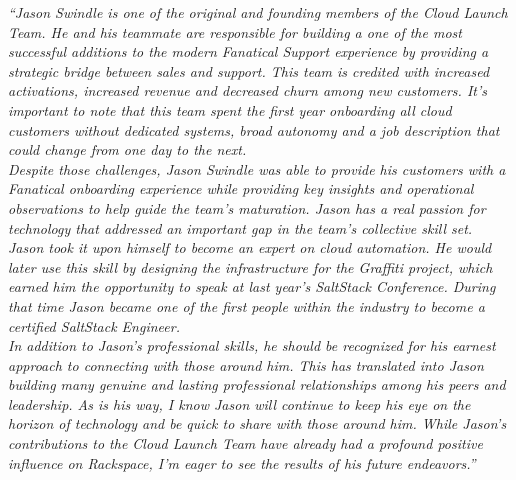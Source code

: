 \setlength\parindent{2em} \textit{
``Jason Swindle is one of the original and founding members of the Cloud Launch Team. He and his teammate are responsible for building a one of the most successful additions to the modern Fanatical Support experience by providing a strategic bridge between sales and support.  This team is credited with increased activations, increased revenue and decreased churn among new customers.  It’s important to note that this team spent the first year onboarding all cloud customers without dedicated systems, broad autonomy and a job description that could change from one day to the next.} \\[5pt]

\setlength\parindent{2em} \textit{
Despite those challenges, Jason Swindle was able to provide his customers with a Fanatical onboarding experience while providing key insights and operational observations to help guide the team’s maturation.  Jason has a real passion for technology that addressed an important gap in the team’s collective skill set. Jason took it upon himself to become an expert on cloud automation. He would later use this skill by designing the infrastructure for the Graffiti project, which earned him the opportunity to speak at last year’s SaltStack Conference. During that time Jason became one of the first people within the industry to become a certified SaltStack Engineer.} \\[5pt]

\setlength\parindent{2em} \textit{
In addition to Jason’s professional skills, he should be recognized for his earnest approach to connecting with those around him. This has translated into Jason building many genuine and lasting professional relationships among his peers and leadership.  As is his way, I know Jason will continue to keep his eye on the horizon of technology and be quick to share with those around him. While Jason’s contributions to the Cloud Launch Team have already had a profound positive influence on Rackspace, I’m eager to see the results of his future endeavors.''}
  \leavevmode \\[10pt]
